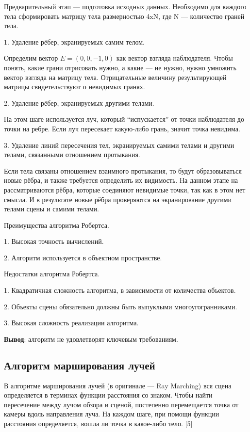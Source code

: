 Предварительный этап --- подготовка исходных данных. Необходимо для каждого тела сформировать матрицу тела размерностью 4xN, где N --– количество граней тела.

1.	Удаление рёбер, экранируемых самим телом.

Определим вектор $E = (0, 0, -1, 0)$ как вектор взгляда наблюдателя. Чтобы понять, какие грани отрисовать нужно, а какие --– не нужно, нужно умножить вектор взгляда на матрицу тела. Отрицательные величину результирующей матрицы свидетельствуют о невидимых гранях.

2.	Удаление рёбер, экранируемых другими телами.

На этом шаге используется луч, который “испускается” от точки наблюдателя до точки на ребре. Если луч пересекает какую-либо грань, значит точка невидима.

3.	Удаление линий пересечения тел, экранируемых самими телами и другими телами, связанными отношением протыкания.

Если тела связаны отношением взаимного протыкания, то будут образовываться новые рёбра, и также требуется определить их видимость. На данном этапе на рассматриваются рёбра, которые соединяют невидимые точки, так как в этом нет смысла. И в результате новые рёбра проверяются на экранирование другими телами сцены и самими телами.
	
Преимущества алгоритма Робертса.

1.	Высокая точность вычислений.

2.	Алгоритм используется в объектном пространстве.
	
Недостатки алгоритма Робертса.

1.	Квадратичная сложность алгоритма, в зависимости от количества объектов.

2.	Объекты сцены обязательно должны быть выпуклыми многоугогранниками.

3.	Высокая сложность реализации алгоритма.

\textbf{Вывод}: алгоритм не удовлетворят ключевым требованиям.

\subsection {Алгоритм марширования лучей}

 В алгоритме марширования лучей (в оригинале --- Ray Marching) вся сцена определяется в терминах функции расстояния со знаком. Чтобы найти пересечение между лучом обзора и сценой, постепенно перемещается точка от камеры вдоль направления луча. На каждом шаге, при помощи функции расстояния определяется, вошла ли точка в какое-либо тело. [5]

